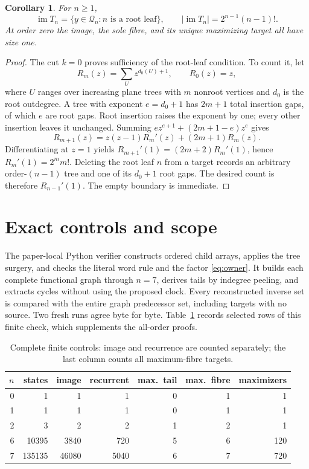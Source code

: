 \documentclass[a4paper,10pt]{amsart}
\newtheorem{corollary}[theorem]{Corollary}
\theoremstyle{remark}
\newcommand{\Q}{\mathcal Q}
\newcommand{\im}{\operatorname{im}}
\begin{document}
\begin{corollary}\label{cor:image}
For $n\ge1$,
\[
 \im T_n=\{y\in\Q_n:n\text{ is a root leaf}\},
 \qquad |\im T_n|=2^{n-1}(n-1)!.
\]
At order zero the image, the sole fibre, and its unique maximizing
target all have size one.
\end{corollary}

\begin{proof}
The cut $k=0$ proves sufficiency of the root-leaf condition. To count it,
let
\[
 R_m(z)=\sum_U z^{d_0(U)+1},\qquad R_0(z)=z,
\]
where $U$ ranges over increasing plane trees with $m$ nonroot vertices
and $d_0$ is the root outdegree. A tree with exponent $e=d_0+1$ has
$2m+1$ total insertion gaps, of which $e$ are root gaps. Root insertion
raises the exponent by one; every other insertion leaves it unchanged.
Summing $e z^{e+1}+(2m+1-e)z^e$ gives
\[
 R_{m+1}(z)=z(z-1)R_m'(z)+(2m+1)R_m(z).
\]
Differentiating at $z=1$ yields
$R_{m+1}'(1)=(2m+2)R_m'(1)$, hence $R_m'(1)=2^m m!$.
Deleting the root leaf $n$ from a target records an arbitrary
order-$(n-1)$ tree and one of its $d_0+1$ root gaps. The desired count is
therefore $R_{n-1}'(1)$. The empty boundary is immediate.
\end{proof}

\section{Exact controls and scope}

The paper-local Python verifier constructs ordered child arrays, applies
the tree surgery, and checks the literal word rule and the factor
\eqref{eq:owner}. It builds each complete functional graph through
$n=7$, derives tails by indegree peeling, and extracts cycles without
using the proposed clock. Every reconstructed inverse set is compared
with the entire graph predecessor set, including targets with no source.
Two fresh runs agree byte for byte. Table~\ref{tab:checks} records selected
rows of this finite check, which supplements the all-order proofs.

\begin{table}[ht]
\centering
\caption{Complete finite controls: image and recurrence are counted
separately; the last column counts all maximum-fibre targets.}
\label{tab:checks}
\begin{tabular}{r|r r r r r r}
$n$&states&image&recurrent&max.\ tail&max.\ fibre&maximizers\\\hline
0&1&1&1&0&1&1\\
1&1&1&1&0&1&1\\
2&3&2&2&1&2&1\\
6&10395&3840&720&5&6&120\\
7&135135&46080&5040&6&7&720
\end{tabular}
\end{table}
\end{document}
